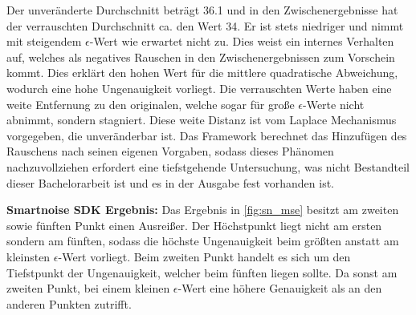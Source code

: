 Der unveränderte Durchschnitt beträgt 36.1 und in den Zwischenergebnisse hat der verrauschten Durchschnitt ca. den Wert 34. Er ist stets niedriger und nimmt mit steigendem $\epsilon$-Wert wie erwartet nicht zu. Dies weist ein internes Verhalten auf, welches als negatives Rauschen in den Zwischenergebnissen zum Vorschein kommt. Dies erklärt den hohen Wert für die mittlere quadratische Abweichung, wodurch eine hohe Ungenauigkeit vorliegt. Die verrauschten Werte haben eine weite Entfernung zu den originalen, welche sogar für große $\epsilon$-Werte nicht abnimmt, sondern stagniert. Diese weite Distanz ist vom Laplace Mechanismus vorgegeben, die unveränderbar ist. Das Framework berechnet das Hinzufügen des Rauschens nach seinen eigenen Vorgaben, sodass dieses Phänomen nachzuvollziehen erfordert eine tiefstgehende Untersuchung, was nicht Bestandteil dieser Bachelorarbeit ist und es in der Ausgabe fest vorhanden ist.

\textbf{Smartnoise SDK Ergebnis:}
Das Ergebnis in \cref{fig:sn_mse} besitzt am zweiten sowie fünften Punkt einen Ausreißer. Der Höchstpunkt liegt nicht am ersten sondern am fünften, sodass die höchste Ungenauigkeit beim größten anstatt am kleinsten $\epsilon$-Wert vorliegt. Beim zweiten Punkt handelt es sich um den Tiefstpunkt der Ungenauigkeit, welcher beim fünften liegen sollte. Da sonst am zweiten Punkt, bei einem kleinen $\epsilon$-Wert eine höhere Genauigkeit als an den anderen Punkten zutrifft.

